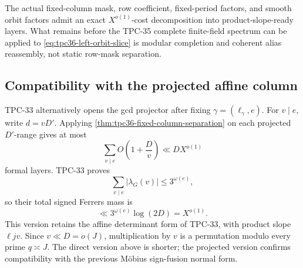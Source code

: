 \begin{corollary}
\label{cor:tpc36-static-half-gate}
The actual fixed-column mask, row coefficient, fixed-period factors, and
smooth orbit factors admit an exact \(X^{o(1)}\)-cost decomposition into
product-slope-ready layers.  What remains before the TPC-35 complete
finite-field spectrum can be applied to
\eqref{eq:tpc36-left-orbit-slice} is modular completion and coherent
alias reassembly, not static row-mask separation.
\end{corollary}

\subsection{Compatibility with the projected affine column}

TPC-33 alternatively opens the gcd projector after fixing
\(\gamma=(\ell_\gamma,e)\).  For \(v\mid e\), write \(d=vD'\).  Applying
\cref{thm:tpc36-fixed-column-separation} on each projected \(D'\)-range
gives at most
\begin{equation}
 \sum_{v\mid e}O\!\left(1+\frac Dv\right)
 \ll DX^{o(1)}
 \label{eq:tpc36-projected-layer-count}
\end{equation}
formal layers.  TPC-33 proves
\begin{equation}
 \sum_{v\mid e}|\lambda_G(v)|\le3^{\omega(e)},
 \label{eq:tpc36-fixed-column-gcd-mass}
\end{equation}
so their total signed Ferrers mass is
\begin{equation}
 \ll3^{\omega(e)}\log(2D)=X^{o(1)}.
 \label{eq:tpc36-projected-projective-cost}
\end{equation}
This version retains the affine determinant form of TPC-33, with product
slope \(\ell jv\).  Since \(v\ll D=o(J)\), multiplication by \(v\) is a
permutation modulo every prime \(q\asymp J\).  The direct version above is
shorter; the projected version confirms compatibility with the previous
M\"obius sign-fusion normal form.
